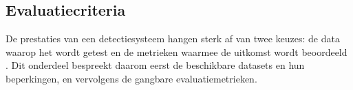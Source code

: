 \subsection{Evaluatiecriteria}
\label{subsec:evaluatiecriteria}

De prestaties van een detectiesysteem hangen sterk af van twee keuzes: de data waarop het wordt getest en de metrieken waarmee de uitkomst wordt beoordeeld \autocite{Salloum2022}. Dit onderdeel bespreekt daarom eerst de beschikbare datasets en hun beperkingen, en vervolgens de gangbare evaluatiemetrieken.


